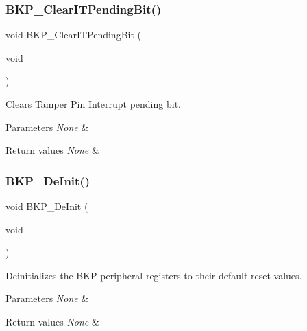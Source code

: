 \subsubsection{\texorpdfstring{BKP\_ClearITPendingBit()}{BKP\_ClearITPendingBit()}}
{\footnotesize\ttfamily void B\+K\+P\+\_\+\+Clear\+I\+T\+Pending\+Bit (\begin{DoxyParamCaption}\item[{void}]{ }\end{DoxyParamCaption})}



Clears Tamper Pin Interrupt pending bit. 


\begin{DoxyParams}{Parameters}
{\em None} & \\
\hline
\end{DoxyParams}

\begin{DoxyRetVals}{Return values}
{\em None} & \\
\hline
\end{DoxyRetVals}
\mbox{\label{group___b_k_p___exported___functions_gaabff4d8f5ebf4fd9a840bcc9042ca226}} 
\subsubsection{\texorpdfstring{BKP\_DeInit()}{BKP\_DeInit()}}
{\footnotesize\ttfamily void B\+K\+P\+\_\+\+De\+Init (\begin{DoxyParamCaption}\item[{void}]{ }\end{DoxyParamCaption})}



Deinitializes the B\+KP peripheral registers to their default reset values. 


\begin{DoxyParams}{Parameters}
{\em None} & \\
\hline
\end{DoxyParams}

\begin{DoxyRetVals}{Return values}
{\em None} & \\
\hline
\end{DoxyRetVals}
\mbox{\label{group___b_k_p___exported___functions_gacc9aedde760383f0bd146f0d77a547db}} 
